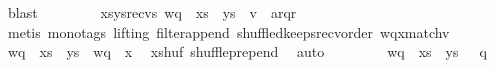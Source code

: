 \begin{isabellebody}
\ blast\ \isanewline
\ \ \ \ \isamarkupfalse%
\ \isamarkupfalse%
\ xsys{\isacharunderscore}{\kern0pt}recvs{\isacharcolon}{\kern0pt}\ {\isachardoublequoteopen}{\isacharparenleft}{\kern0pt}{\isacharparenleft}{\kern0pt}{\isacharparenleft}{\kern0pt}wq\ {\isasymsqdot}\ {\isacharparenleft}{\kern0pt}xs\ {\isasymsqdot}\ ys{\isacharparenright}{\kern0pt}{\isacharparenright}{\kern0pt}{\isasymdown}\isactrlsub {\isacharquery}{\kern0pt}{\isacharparenright}{\kern0pt}{\isasymdown}\isactrlsub {\isacharbang}{\kern0pt}\isactrlsub {\isacharquery}{\kern0pt}{\isacharparenright}{\kern0pt}\ {\isacharequal}{\kern0pt}\ {\isacharparenleft}{\kern0pt}{\isacharparenleft}{\kern0pt}{\isacharparenleft}{\kern0pt}{\isacharparenleft}{\kern0pt}{\isacharparenleft}{\kern0pt}{\isacharquery}{\kern0pt}v{\isacharprime}{\kern0pt}\ {\isasymsqdot}\ {\isacharbrackleft}{\kern0pt}a{\isacharbrackright}{\kern0pt}{\isacharparenright}{\kern0pt}{\isasymdown}\isactrlsub {\isacharbang}{\kern0pt}{\isacharparenright}{\kern0pt}{\isasymdown}\isactrlsub r{\isacharparenright}{\kern0pt}{\isasymdown}\isactrlsub {\isacharbraceleft}{\kern0pt}\isactrlsub q\isactrlsub {\isacharcomma}{\kern0pt}\isactrlsub r\isactrlsub {\isacharbraceright}{\kern0pt}{\isacharparenright}{\kern0pt}{\isasymdown}\isactrlsub {\isacharbang}{\kern0pt}\isactrlsub {\isacharquery}{\kern0pt}{\isacharparenright}{\kern0pt}{\isachardoublequoteclose}\ \ \isamarkupfalse%
\ {\isacharparenleft}{\kern0pt}metis\ {\isacharparenleft}{\kern0pt}mono{\isacharunderscore}{\kern0pt}tags{\isacharcomma}{\kern0pt}\ lifting{\isacharparenright}{\kern0pt}\ filter{\isacharunderscore}{\kern0pt}append\ shuffled{\isacharunderscore}{\kern0pt}keeps{\isacharunderscore}{\kern0pt}recv{\isacharunderscore}{\kern0pt}order\ wqx{\isacharunderscore}{\kern0pt}match{\isacharunderscore}{\kern0pt}v{\isacharprime}{\kern0pt}{\isacharparenright}{\kern0pt}\ \ \isanewline
\ \ \ \ \isamarkupfalse%
\ {\isachardoublequoteopen}{\isacharparenleft}{\kern0pt}wq\ {\isasymsqdot}\ xs\ {\isasymsqdot}\ ys{\isacharparenright}{\kern0pt}\ {\isasymsqunion}{\isasymsqunion}\isactrlsub {\isacharquery}{\kern0pt}\ {\isacharparenleft}{\kern0pt}wq\ {\isasymsqdot}\ x{\isacharparenright}{\kern0pt}{\isachardoublequoteclose}\ \isamarkupfalse%
\ x{\isacharunderscore}{\kern0pt}shuf\ shuffle{\isacharunderscore}{\kern0pt}prepend\ \isamarkupfalse%
\ auto\ \isanewline
\ \ \ \ \isamarkupfalse%
\ \isamarkupfalse%
\ {\isachardoublequoteopen}wq\ {\isasymsqdot}\ xs\ {\isasymsqdot}\ ys\ {\isasymin}\ {\isasymL}\isactrlsup {\isacharasterisk}{\kern0pt}\ q{\isachardoublequoteclose}\ \isamarkupfalse%

\end{isabellebody}
